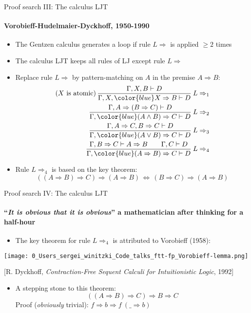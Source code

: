 \documentclass[english]{beamer}
\begin{document}
\begin{frame}{Proof search III: The calculus LJT}


\framesubtitle{Vorobieff-Hudelmaier-Dyckhoff, 1950-1990}
\begin{itemize}
\item The Gentzen calculus generates a loop if rule $L\Rightarrow$ is applied
$\geq2$ times
\item The calculus LJT keeps all rules of LJ except rule $L\Rightarrow$
\item Replace rule $L\Rightarrow$ by pattern-matching on $A$ in the premise
$A\Rightarrow B$:
\begin{align*}
\text{(}X\text{ is atomic)\,}\frac{\Gamma,X,B\vdash D}{\Gamma,X,{\color{blue}X\Rightarrow B}\vdash D}\:L\Rightarrow_{1}\\
\frac{\Gamma,A\Rightarrow(B\Rightarrow C)\vdash D}{\Gamma,{\color{blue}(A\wedge B)\Rightarrow C}\vdash D}\:L\Rightarrow_{2}\\
\frac{\Gamma,A\Rightarrow C,B\Rightarrow C\vdash D}{\Gamma,{\color{blue}(A\vee B)\Rightarrow C}\vdash D}\:L\Rightarrow_{3}\\
\frac{\Gamma,B\Rightarrow C\vdash A\Rightarrow B\quad\quad\Gamma,C\vdash D}{\Gamma,{\color{blue}(A\Rightarrow B)\Rightarrow C}\vdash D}\:L\Rightarrow_{4}
\end{align*}
\item Rule $L\Rightarrow_{4}$ is based on the key theorem: 
\[
\left(\left(A\Rightarrow B\right)\Rightarrow C\right)\Rightarrow\left(A\Rightarrow B\right)\,\Longleftrightarrow\,\left(B\Rightarrow C\right)\Rightarrow\left(A\Rightarrow B\right)
\]
\end{itemize}
\end{frame}

\begin{frame}{Proof search IV: The calculus LJT}


\framesubtitle{``\emph{It is obvious that it is obvious}'' \textendash{} a mathematician
after thinking for a half-hour}
\begin{itemize}
\item The key theorem for rule $L\Rightarrow_{4}$ is attributed to Vorobieff
(1958):
\end{itemize}
\begin{center}
\texttt{[image: 0\_Users\_sergei\_winitzki\_Code\_talks\_ftt-fp\_Vorobieff-lemma.png]}
\par\end{center}

\begin{center}
{\footnotesize{}{[}R. Dyckhoff, }\emph{\footnotesize{}Contraction-Free
Sequent Calculi for Intuitionistic Logic}{\footnotesize{}, 1992{]}}
\par\end{center}{\footnotesize \par}
\begin{itemize}
\item A stepping stone to this theorem:
\[
\left(\left(A\Rightarrow B\right)\Rightarrow C\right)\Rightarrow B\Rightarrow C
\]
Proof (\emph{obviously} trivial): $f\Rightarrow b\Rightarrow f\:(\_\Rightarrow b)$
\end{itemize}
\end{frame}
\end{document}
